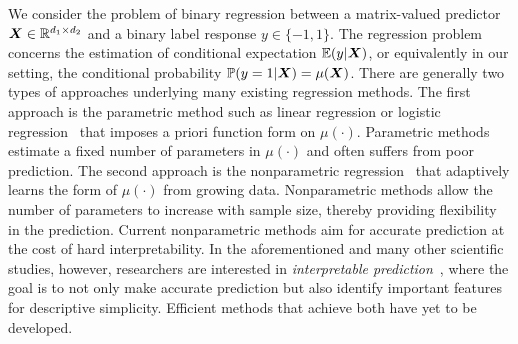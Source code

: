 \documentclass[11pt]{article}
\theoremstyle{plain}
\theoremstyle{definition}
\begin{document}
We consider the problem of binary regression between a matrix-valued predictor $\bm X \in \mathbb{R}^{d_1\times d_2}$ and a binary label response $y\in\{-1,1\}$. The regression problem concerns the estimation of conditional expectation $\mathbb{E}(y|\bm X)$, or equivalently in our setting, the conditional probability $\mathbb{P}(y=1|\bm X)=\mu(\bm X)$. There are generally two types of approaches underlying many existing regression methods. The first approach is the parametric method such as linear regression or logistic regression~\citep{fan2019generalized, relion2019network} that imposes a priori function form on $\mu(\cdot)$. Parametric methods estimate a fixed number of parameters in $\mu(\cdot)$ and often suffers from poor prediction. The second approach is the nonparametric regression~\citep{wasserman2006all,tsybakov2008introduction} that adaptively learns the form of $\mu(\cdot)$ from growing data. Nonparametric methods allow the number of parameters to increase with sample size, thereby providing flexibility in the prediction. Current nonparametric methods aim for accurate prediction at the cost of hard interpretability. In the aforementioned and many other scientific studies, however, researchers are interested in {\it interpretable prediction}~\citep{murdoch2019definitions}, where the goal is to not only make accurate prediction but also identify important features for descriptive simplicity. Efficient methods that achieve both have yet to be developed. 

\end{document}
